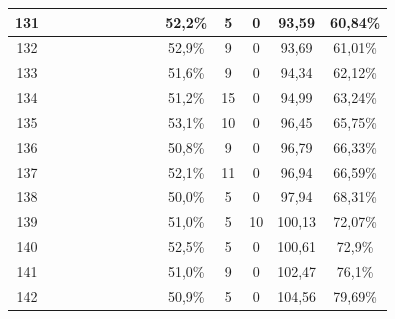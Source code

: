 \begin{longtable}{|c|c|c|c|c|c|c|c|c|c|c|c|c|c|}
131 &  \x    & \x    &       & \x    &       & \x    &       & \x    & 52,2\% &  5  & 0  & 93,59 & 60,84\% \\ \hline
132 &  \x    & \x    &       & \x    &       &       &       &       & 52,9\% &  9  & 0  & 93,69 & 61,01\% \\ \hline
133 &  \x    & \x    &       &       &       &       &       & \x    & 51,6\% &  9  & 0  & 94,34 & 62,12\% \\ \hline
134 &  \x    & \x    &       &       &       &       &       &       & 51,2\% &  15 & 0  & 94,99 & 63,24\% \\ \hline
135 &  \x    & \x    &       & \x    &       &       &       & \x\m  & 53,1\% &  10 & 0  & 96,45 & 65,75\% \\ \hline
136 &  \x    & \x    &       &       &       & \x\m  &       &       & 50,8\% &  9  & 0  & 96,79 & 66,33\% \\ \hline
137 &  \x    & \x    &       &       &       &       & \x\m  &       & 52,1\% &  11 & 0  & 96,94 & 66,59\% \\ \hline
138 &  \x    & \x    &       &       &       & \x    &       &       & 50,0\% &  5  & 0  & 97,94 & 68,31\% \\ \hline
139 &  \x    & \x    &       & \x    &       & \x\m  &       & \x\m  & 51,0\% &  5  & 10 & 100,13 & 72,07\% \\ \hline
140 &  \x    & \x    &       & \x    &       & \x\m  & \x\m  &       & 52,5\% &  5  & 0  & 100,61 & 72,9\% \\ \hline
141 &  \x    & \x    &       &       &       & \x\m  & \x\m  &       & 51,0\% &  9  & 0  & 102,47 & 76,1\% \\ \hline
142 &  \x    & \x    &       &       &       & \x    &       & \x    & 50,9\% &  5  & 0  & 104,56 & 79,69\% \\ \hline
\end{longtable}
\normalsize

